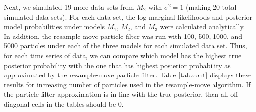 \documentclass{article}
\begin{document}
Next, we simulated 19 more data sets from $M_2$ with $\sigma^2 = 1$ (making 20 total simulated data sets). For each data set, the log marginal likelihoods and posterior model probabilities under models $M_1$, $M_2$, and $M_3$ were calculated analytically. In addition, the resample-move particle filter was run with 100, 500, 1000, and 5000 particles under each of the three models for each simulated data set. Thus, for each time series of data, we can compare which model has the highest true posterior probability with the one that has highest posterior probability as approximated by the resample-move particle filter. Table \ref{tab:cont} displays these results for increasing number of particles used in the resample-move algorithm. If the particle filter approximation is in line with the true posterior, then all off-diagonal cells in the tables should be 0.
\end{document}
